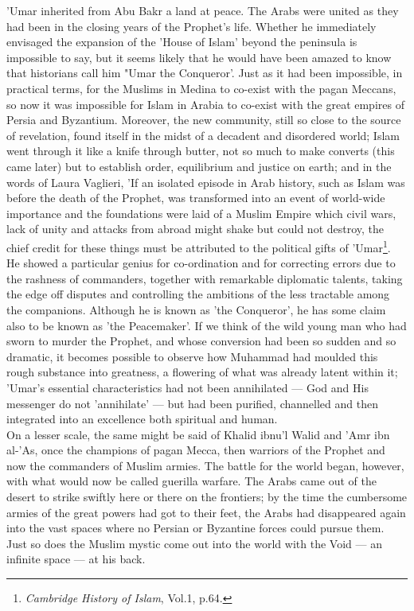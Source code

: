 \documentclass[11pt, b5paper, twoside]{book}
\begin{document}
'Umar inherited from Abu Bakr a land at peace. The Arabs were united as they had been in the closing years of the Prophet's life. Whether he immediately envisaged the expansion of the 'House of Islam' beyond the peninsula is impossible to say, but it seems likely that he would have been amazed to know that historians call him "Umar the Conqueror'. Just as it had been impossible, in practical terms, for the Muslims in Medina to co-exist with the pagan Meccans, so now it was impossible for Islam in Arabia to co-exist with the great empires of Persia and Byzantium. Moreover, the new community, still so close to the source of revelation, found itself in the midst of a decadent and disordered world; Islam went through it like a knife through butter, not so much to make converts (this came later) but to establish order, equilibrium and justice on earth; and in the words of Laura Vaglieri, 'If an isolated episode in Arab history, such as Islam was before the death of the Prophet, was transformed into an event of world-wide importance and the foundations were laid of a Muslim Empire which civil wars, lack of unity and attacks from abroad might shake but could not destroy, the chief credit for these things must be attributed to the political gifts of 'Umar\footnote{\emph{Cambridge History of Islam}, Vol.1, p.64.}. \\

He showed a particular genius for co-ordination and for correcting errors due to the rashness of commanders, together with remarkable diplomatic talents, taking the edge off disputes and controlling the ambitions of the less tractable among the companions. Although he is known as 'the Conqueror', he has some claim also to be known as 'the Peacemaker'. If we think of the wild young man who had sworn to murder the Prophet, and whose conversion had been so sudden and so dramatic, it becomes possible to observe how Muhammad had moulded this rough substance into greatness, a flowering of what was already latent within it; 'Umar's essential characteristics had not been annihilated --- God and His messenger do not 'annihilate' --- but had been purified, channelled and then integrated into an excellence both spiritual and human. \\

On a lesser scale, the same might be said of Khalid ibnu'l Walid and 'Amr ibn al-'As, once the champions of pagan Mecca, then warriors of the Prophet and now the commanders of Muslim armies. The battle for the world began, however, with what would now be called guerilla warfare. The Arabs came out of the desert to strike swiftly here or there on the frontiers; by the time the cumbersome armies of the great powers had got to their feet, the Arabs had disappeared again into the vast spaces where no Persian or Byzantine forces could pursue them. Just so does the Muslim mystic come out into the world with the Void --- an infinite space --- at his back. \\
\end{document}
